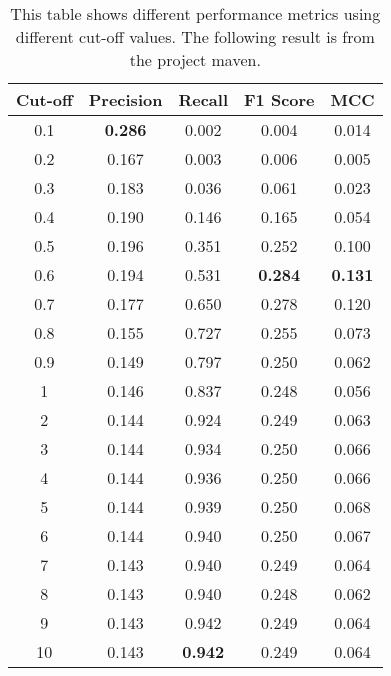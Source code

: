 \begin{table}[!ht]
\centering
\caption{This table shows different performance metrics using different cut-off values.
The following result is from the project maven. }
\begin{tabular}{|c|c|c|c|c|}
\hline
Cut-off & \multicolumn{1}{c|}{Precision} & \multicolumn{1}{c|}{Recall} & \multicolumn{1}{c|}{F1 Score} & \multicolumn{1}{c|}{MCC} \\ \hline
0.1 & \textbf{0.286} & 0.002 & 0.004 & 0.014 \\ \hline
0.2 & 0.167 & 0.003 & 0.006 & 0.005 \\ \hline
0.3 & 0.183 & 0.036 & 0.061 & 0.023 \\ \hline
0.4 & 0.190 & 0.146 & 0.165 & 0.054 \\ \hline
0.5 & 0.196 & 0.351 & 0.252 & 0.100 \\ \hline
0.6 & 0.194 & 0.531 & \textbf{0.284} & \textbf{0.131} \\ \hline
0.7 & 0.177 & 0.650 & 0.278 & 0.120 \\ \hline
0.8 & 0.155 & 0.727 & 0.255 & 0.073 \\ \hline
0.9 & 0.149 & 0.797 & 0.250 & 0.062 \\ \hline
1 & 0.146 & 0.837 & 0.248 & 0.056 \\ \hline
2 & 0.144 & 0.924 & 0.249 & 0.063 \\ \hline
3 & 0.144 & 0.934 & 0.250 & 0.066 \\ \hline
4 & 0.144 & 0.936 & 0.250 & 0.066 \\ \hline
5 & 0.144 & 0.939 & 0.250 & 0.068 \\ \hline
6 & 0.144 & 0.940 & 0.250 & 0.067 \\ \hline
7 & 0.143 & 0.940 & 0.249 & 0.064 \\ \hline
8 & 0.143 & 0.940 & 0.248 & 0.062 \\ \hline
9 & 0.143 & 0.942 & 0.249 & 0.064 \\ \hline
10 & 0.143 & \textbf{0.942} & 0.249 & 0.064 \\ \hline
\end{tabular}%
\label{tab:rq_2}
\end{table}